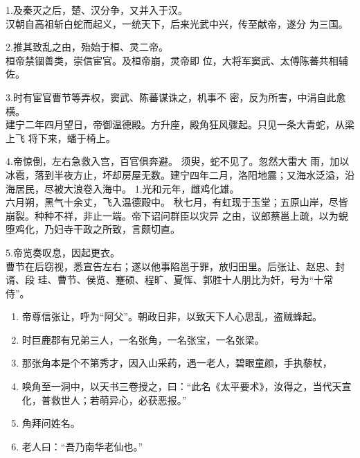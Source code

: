 \documentclass[UTF8,12pt,twoside,a4paper]{ctexart} %
\begin{document}
\begin{titlepage}
1.\heiti  及秦灭之后，楚、汉分争，又并入于汉。\\
\songti 汉朝自高祖斩白蛇而起义，一统天下，后来光武中兴，传至献帝，遂分
为三国。

2.\heiti 推其致乱之由，殆始于桓、灵二帝。\\
\songti 桓帝禁锢善类，崇信宦官。及桓帝崩，灵帝即
位，大将军窦武、太傅陈蕃共相辅佐。

3.\heiti  时有宦官曹节等弄权，窦武、陈蕃谋诛之，机事不
密，反为所害，中涓自此愈横。\\
\songti 建宁二年四月望日，帝御温德殿。方升座，殿角狂风骤起。只见一条大青蛇，从梁上飞
将下来，蟠于椅上。

4.\heiti 帝惊倒，左右急救入宫，百官俱奔避。
\songti 须臾，蛇不见了。忽然大雷大
雨，加以冰雹，落到半夜方止，坏却房屋无数。建宁四年二月，洛阳地震；又海水泛溢，沿
海居民，尽被大浪卷入海中。
1.\heiti  光和元年，雌鸡化雄。\\
\songti   六月朔，黑气十余丈，飞入温德殿中。
秋七月，有虹现于玉堂；五原山岸，尽皆崩裂。种种不祥，非止一端。帝下诏问群臣以灾异
之由，议郎蔡邕上疏，以为蜺堕鸡化，乃妇寺干政之所致，言颇切直。

5.\heiti 帝览奏叹息，因起更衣。\\
\songti 曹节在后窃视，悉宣告左右；遂以他事陷邕于罪，放归田里。后张让、赵忠、封谞、段
珪、曹节、侯览、蹇硕、程旷、夏恽、郭胜十人朋比为奸，号为“十常侍”。


\begin{flushleft}
\end{flushleft}

\begin{enumerate}%
	\songti
  \item 帝尊信张让，呼为“阿父”。朝政日非，以致天下人心思乱，盗贼蜂起。
  \item 时巨鹿郡有兄弟三人，一名张角，一名张宝，一名张梁。
  \item  那张角本是个不第秀才，因入山采药，遇一老人，碧眼童颜，手执藜杖，
	\item 唤角至一洞中，以天书三卷授之，曰：“此名《太平要术》，汝得之，当代天宣化，普救世人；若萌异心，必获恶报。”
  \item  角拜问姓名。
  \item  老人曰：“吾乃南华老仙也。”
\end{enumerate}

\begin{flushleft}
 
\end{flushleft}


\end{titlepage}
\end{document}
